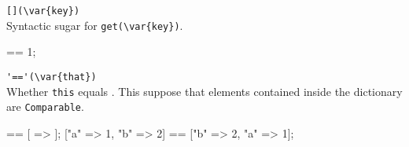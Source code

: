 \begin{urbiscriptapi}
\item \lstinline|[](\var{key})|\\
  Syntactic sugar for \lstinline|get(\var{key})|.

\begin{urbiassert}
["one" => 1]["one"] == 1;
\end{urbiassert}

\item \lstinline|'=='(\var{that})|\\
  Whether \lstinline|this| equals .  This suppose that elements
  contained inside the dictionary are \lstinline|Comparable|.
\begin{urbiassert}
[ => ] == [ => ];
["a" => 1, "b" => 2] == ["b" => 2, "a" => 1];
\end{urbiassert}

\end{urbiscriptapi}


